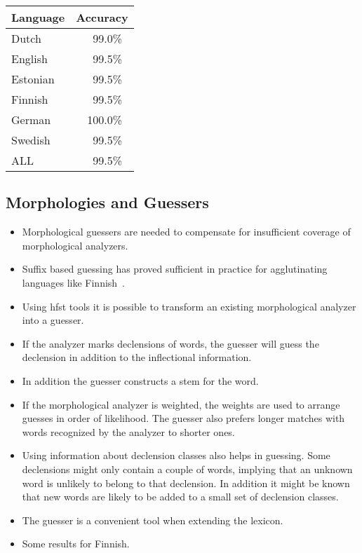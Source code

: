 \documentclass{llncs}
\begin{document}
\begin{table}
\begin{tabular}{l|l}
Language & Accuracy\\
\hline
Dutch    & ~~~99.0\%\\
English  & ~~~99.5\%\\
Estonian & ~~~99.5\%\\
Finnish  & ~~~99.5\%\\
German   & ~~100.0\%\\
Swedish  & ~~~99.5\%\\
\hline
ALL      & ~~~99.5\%
\end{tabular}
\end{table}

\subsection{Morphologies and Guessers}
\label{sec: morph-guessers}
\begin{itemize}
\item Morphological guessers are needed to compensate for insufficient
  coverage of morphological analyzers.
\item Suffix based guessing has proved sufficient in practice for
  agglutinating languages like Finnish~\cite{linden/2009/nodalida}.
\item Using hfst tools it is possible to transform an existing morphological analyzer into a guesser. 
\item If the analyzer marks declensions of words, the guesser will
  guess the declension in addition to the inflectional information.
\item In addition the guesser constructs a stem for the word.
\item If the morphological analyzer is weighted, the weights are used
  to arrange guesses in order of likelihood. The guesser also prefers
  longer matches with words recognized by the analyzer to shorter
  ones.
\item Using information about declension classes also helps in
  guessing. Some declensions might only contain a couple of words,
  implying that an unknown word is unlikely to belong to that
  declension. In addition it might be known that new words are likely
  to be added to a small set of declension classes.
\item The guesser is a convenient tool when extending the lexicon.
\item Some results for Finnish.
\end{itemize}
\end{document}
